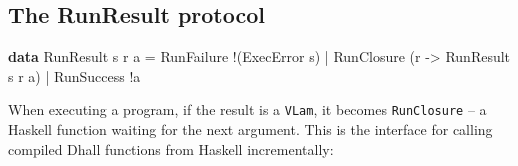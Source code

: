 \documentclass[]{article}
\newenvironment{Shaded}{}{}
\newcommand{\DataTypeTok}[1]{\textcolor[rgb]{0.56,0.13,0.00}{#1}}
\newcommand{\DecValTok}[1]{\textcolor[rgb]{0.25,0.63,0.44}{#1}}
\newcommand{\FunctionTok}[1]{\textcolor[rgb]{0.02,0.16,0.49}{#1}}
\newcommand{\KeywordTok}[1]{\textcolor[rgb]{0.00,0.44,0.13}{\textbf{#1}}}
\newcommand{\NormalTok}[1]{#1}
\newcommand{\OperatorTok}[1]{\textcolor[rgb]{0.40,0.40,0.40}{#1}}
\newcommand{\OtherTok}[1]{\textcolor[rgb]{0.00,0.44,0.13}{#1}}
\begin{document}
\begin{Shaded}
\end{Shaded}

\subsection{The RunResult protocol}\label{the-runresult-protocol}

\begin{Shaded}
\begin{Highlighting}[]
\KeywordTok{data} \DataTypeTok{RunResult}\NormalTok{ s r a}
    \OtherTok{=} \DataTypeTok{RunFailure} \OperatorTok{!}\NormalTok{(}\DataTypeTok{ExecError}\NormalTok{ s)}
    \OperatorTok{|} \DataTypeTok{RunClosure}\NormalTok{ (r }\OtherTok{{-}\textgreater{}} \DataTypeTok{RunResult}\NormalTok{ s r a)}
    \OperatorTok{|} \DataTypeTok{RunSuccess} \OperatorTok{!}\NormalTok{a}
\end{Highlighting}
\end{Shaded}

When executing a program, if the result is a \texttt{VLam}, it becomes
\texttt{RunClosure} -- a Haskell function waiting for the next argument. This is
the interface for calling compiled Dhall functions from Haskell incrementally:
\end{document}
